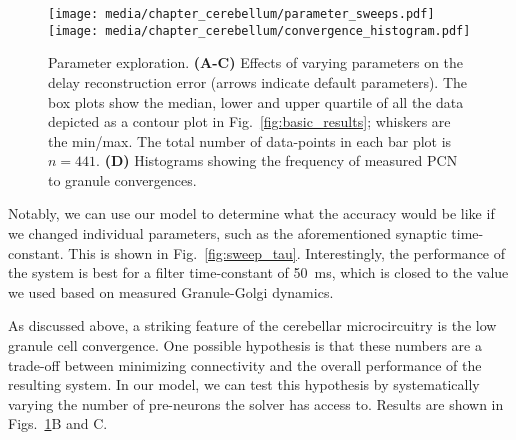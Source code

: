 \begin{figure}[t]%
	\centering
	\texttt{[image: media/chapter\_cerebellum/parameter\_sweeps.pdf]}%
	\texttt{[image: media/chapter\_cerebellum/convergence\_histogram.pdf]}
	\caption[Cerebellum model parameter exploration.]{Parameter exploration. \textbf{(A-C)} Effects of varying parameters on the delay reconstruction error (arrows indicate default parameters). The box plots show the median, lower and upper quartile of all the data depicted as a contour plot in Fig.~\ref{fig:basic_results}; whiskers are the min/max. The total number of data-points in each bar plot is $n = 441$. \textbf{(D)} Histograms showing the frequency of measured PCN to granule convergences.}
	\label{fig:param_sweeps}
\end{figure}

Notably, we can use our model to determine what the accuracy would be like if we changed individual parameters, such as the aforementioned synaptic time-constant.
This is shown in Fig.~\ref{fig:sweep_tau}.
Interestingly, the performance of the system is best for a filter time-constant of \SI{50}{\milli\second}, which is closed to the value we used based on measured Granule-Golgi dynamics.

As discussed above, a striking feature of the cerebellar microcircuitry is the low granule cell convergence. One possible hypothesis is that these numbers are a trade-off between minimizing connectivity and the overall performance of the resulting system.
In our model, we can test this hypothesis by systematically varying the number of pre-neurons the solver has access to. Results are shown in Figs.~\ref{fig:param_sweeps}B and C.

